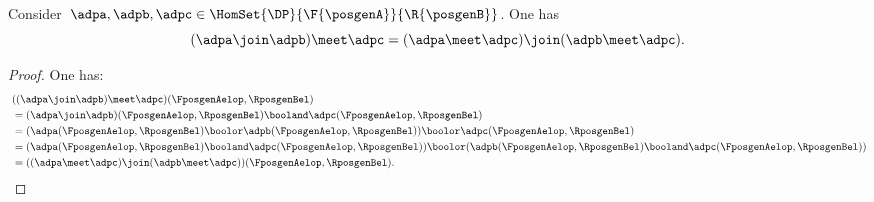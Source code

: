 \begin{lemma}
	\label{lem:wedge_vee}
	Consider~$\adpa,\adpb,\adpc\in \HomSet{\DP}{\F{\posgenA}}{\R{\posgenB}}$.
	One has
	\begin{equation*}
		(\adpa \join \adpb)
		\meet \adpc=(\adpa \meet \adpc) \join (\adpb\meet \adpc).
	\end{equation*}
\end{lemma}
\begin{proof}
	One has:
	\begin{equation*}
		\begin{aligned}
			~ & ((\adpa \join \adpb)\meet \adpc)(\FposgenAelop,\RposgenBel)                                                                                                        \\
			  & = (\adpa \join \adpb)(\FposgenAelop,\RposgenBel)\booland \adpc(\FposgenAelop,\RposgenBel)                                                                          \\
			  & =(\adpa(\FposgenAelop,\RposgenBel) \boolor \adpb(\FposgenAelop,\RposgenBel))\boolor \adpc(\FposgenAelop,\RposgenBel)                                               \\
			  & =(\adpa(\FposgenAelop,\RposgenBel) \booland  \adpc(\FposgenAelop,\RposgenBel)) \boolor (\adpb(\FposgenAelop,\RposgenBel)\booland \adpc(\FposgenAelop,\RposgenBel)) \\
			  & =((\adpa \meet \adpc) \join (\adpb\meet \adpc))(\FposgenAelop,\RposgenBel).
		\end{aligned}
	\end{equation*}
\end{proof}



